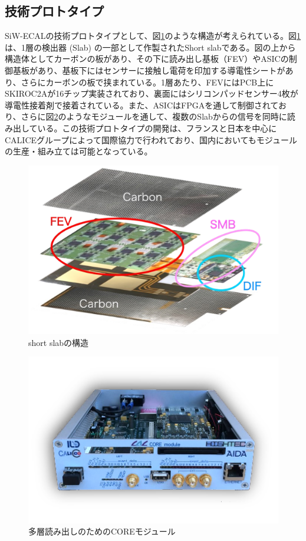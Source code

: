 \subsection{技術プロトタイプ}
SiW-ECALの技術プロトタイプとして、図\ref{shortslab}のような構造が考えられている。図\ref{shortslab}は、1層の検出器 (Slab) の一部として作製されたShort slabである。図の上から構造体としてカーボンの板があり、その下に読み出し基板（FEV）やASICの制御基板があり、基板下にはセンサーに接触し電荷を印加する導電性シートがあり、さらにカーボンの板で挟まれている。1層あたり、FEVにはPCB上にSKIROC2Aが16チップ実装されており、裏面にはシリコンパッドセンサー4枚が導電性接着剤で接着されている。また、ASICはFPGAを通して制御されており、さらに図\ref{core}のようなモジュールを通して、複数のSlabからの信号を同時に読み出している。この技術プロトタイプの開発は、フランスと日本を中心にCALICEグループによって国際協力で行われており、国内においてもモジュールの生産・組み立ては可能となっている。
\begin{figure}[h]
	\begin{center}
	\includegraphics[keepaspectratio, scale=0.7]
 	{Figure/Siwecal/shortslab.png}
 		\caption{short slabの構造}
 		\label{shortslab}
	\end{center}
 \end{figure}
 \begin{figure}[h]
	\begin{center}
	\includegraphics[keepaspectratio, scale=0.7]
 	{Figure/Siwecal/core.png}
 		\caption{多層読み出しのためのCOREモジュール}
 		\label{core}
	\end{center}
 \end{figure}